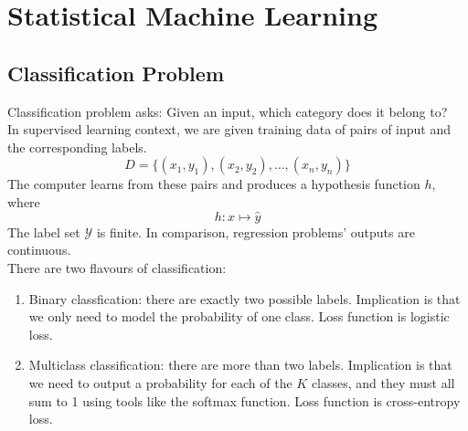 \documentclass[../Probability.tex]{subfiles}
\begin{document}
\section{Statistical Machine Learning}
\subsection{Classification Problem}
Classification problem asks: Given an input, which category does it belong to?\\
In supervised learning context, we are given training data of pairs of input and the corresponding labels.
$$D = \{(x_1, y_1), (x_2, y_2), \ldots, (x_n, y_n)\}$$
The computer learns from these pairs and produces a hypothesis function $h$, where
$$h : x \mapsto \hat{y}$$
The label set $\mathcal{Y}$ is finite. In comparison, regression problems' outputs are continuous.\\
There are two flavours of classification:
\begin{enumerate}
    \item Binary classfication: there are exactly two possible labels.
    Implication is that we only need to model the probability of one class. Loss function is logistic loss.
    \item Multiclass classification: there are more than two labels.
    Implication is that we need to output a probability for each of the $K$ classes, and they must all sum to 1 using tools like the softmax function.
    Loss function is cross-entropy loss.
\end{enumerate}
\end{document}
